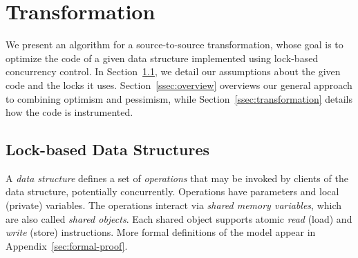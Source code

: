 \renewcommand{\ttdefault}{pcr}
\algrenewcommand{}
\algrenewcommand{}
\algrenewcommand{}
\algrenewcommand{}
\algrenewcommand{}
\algrenewcommand\textproc{\textit}
\newcommand{\codesize}{\footnotesize}



\section{Transformation}\label{sec:algorithm}

We present an algorithm for a source-to-source transformation, whose
goal is to optimize the code of a given data structure implemented using lock-based concurrency control.
In Section~\ref{ssec:locks}, we detail our assumptions about the given code and the locks it uses.
Section~\ref{ssec:overview} overviews our general approach to combining optimism and pessimism,
while
Section~\ref{ssec:transformation} details how the code is instrumented. 

\subsection{Lock-based Data Structures}\label{ssec:locks}

A \emph{data structure} defines a set of \emph{operations} that may be invoked by
clients of the data structure, potentially concurrently.
%
Operations have parameters and local (private) variables. %
%
The operations interact via \emph{shared memory variables}, which are also called \emph{shared objects}.
%
Each shared object supports atomic \emph{read} (load) and \emph{write} (store) instructions.
%
More formal definitions of the model appear in Appendix~\ref{sec:formal-proof}. 

